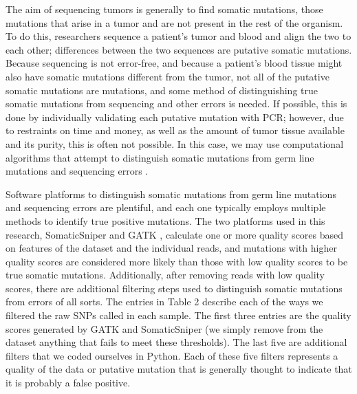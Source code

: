 \documentclass[11pt]{article} %
\begin{document}
The aim of sequencing tumors is generally to find somatic mutations, those mutations that arise in a tumor and are not present in the rest of the organism. To do this, researchers sequence a patient's tumor and blood and align the two to each other; differences between the two sequences are putative somatic mutations. Because sequencing is not error-free, and because a patient's blood tissue might also have somatic mutations different from the tumor, not all of the putative somatic mutations are mutations, and some method of distinguishing true somatic mutations from sequencing and other errors is needed. If possible, this is done by individually validating each putative mutation with PCR; however, due to restraints on time and money, as well as the amount of tumor tissue available and its purity, this is often not possible. In this case, we may use computational algorithms that attempt to distinguish somatic mutations from germ line mutations and sequencing errors \citep{SomaticSniper, mut_calling}. 

Software platforms to distinguish somatic mutations from germ line mutations and sequencing errors are plentiful, and each one typically employs multiple methods to identify true positive mutations. The two platforms used in this research, SomaticSniper \citep{SomaticSniper} and GATK \citep{GATK}, calculate one or more quality scores based on features of the dataset and the individual reads, and mutations with higher quality scores are considered more likely than those with low quality scores to be true somatic mutations. Additionally, after removing reads with low quality scores, there are additional filtering steps used to distinguish somatic mutations from errors of all sorts. The entries in Table 2 describe each of the ways we filtered the raw SNPs called in each sample. The first three entries are the quality scores generated by GATK and SomaticSniper (we simply remove from the dataset anything that fails to meet these thresholds). The last five are additional filters that we coded ourselves in Python. Each of these five filters represents a quality of the data or putative mutation that is generally thought to indicate that it is probably a false positive.
\end{document}
